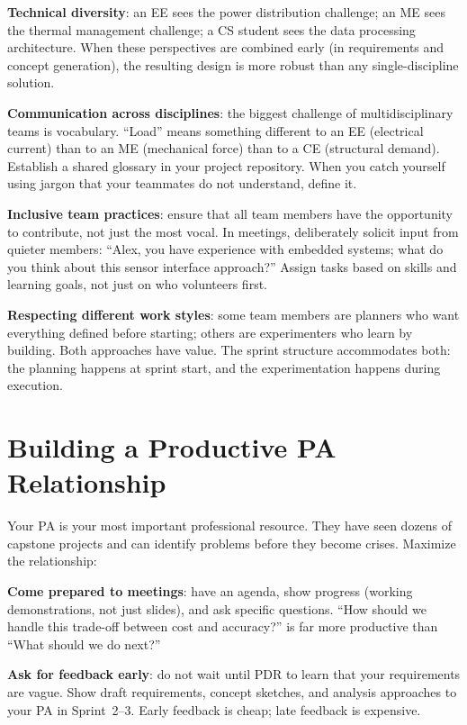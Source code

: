 \textbf{Technical diversity}: an EE sees the power distribution challenge; an ME sees the thermal management challenge; a CS student sees the data processing architecture. When these perspectives are combined early (in requirements and concept generation), the resulting design is more robust than any single-discipline solution.

\textbf{Communication across disciplines}: the biggest challenge of multidisciplinary teams is vocabulary. ``Load'' means something different to an EE (electrical current) than to an ME (mechanical force) than to a CE (structural demand). Establish a shared glossary in your project repository. When you catch yourself using jargon that your teammates do not understand, define it.

\textbf{Inclusive team practices}: ensure that all team members have the opportunity to contribute, not just the most vocal. In meetings, deliberately solicit input from quieter members: ``Alex, you have experience with embedded systems; what do you think about this sensor interface approach?'' Assign tasks based on skills and learning goals, not just on who volunteers first.

\textbf{Respecting different work styles}: some team members are planners who want everything defined before starting; others are experimenters who learn by building. Both approaches have value. The sprint structure accommodates both: the planning happens at sprint start, and the experimentation happens during execution.



\section{Building a Productive PA Relationship}
Your PA is your most important professional resource. They have seen dozens of capstone projects and can identify problems before they become crises. Maximize the relationship:

\textbf{Come prepared to meetings}: have an agenda, show progress (working demonstrations, not just slides), and ask specific questions. ``How should we handle this trade-off between cost and accuracy?'' is far more productive than ``What should we do next?''

\textbf{Ask for feedback early}: do not wait until PDR to learn that your requirements are vague. Show draft requirements, concept sketches, and analysis approaches to your PA in Sprint~2--3. Early feedback is cheap; late feedback is expensive.

